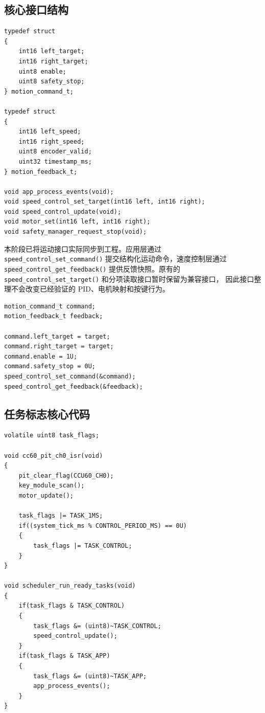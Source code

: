 \documentclass[11pt,a4paper,fontset=fandol]{ctexart}
\begin{document}
\subsection{核心接口结构}

\begin{lstlisting}
typedef struct
{
    int16 left_target;
    int16 right_target;
    uint8 enable;
    uint8 safety_stop;
} motion_command_t;

typedef struct
{
    int16 left_speed;
    int16 right_speed;
    uint8 encoder_valid;
    uint32 timestamp_ms;
} motion_feedback_t;

void app_process_events(void);
void speed_control_set_target(int16 left, int16 right);
void speed_control_update(void);
void motor_set(int16 left, int16 right);
void safety_manager_request_stop(void);
\end{lstlisting}

本阶段已将运动接口实际同步到工程。应用层通过
\texttt{speed\_control\_set\_command()} 提交结构化运动命令，速度控制层通过
\texttt{speed\_control\_get\_feedback()} 提供反馈快照。原有的
\texttt{speed\_control\_set\_target()} 和分项读取接口暂时保留为兼容接口，
因此接口整理不会改变已经验证的 PID、电机映射和按键行为。

\begin{lstlisting}
motion_command_t command;
motion_feedback_t feedback;

command.left_target = target;
command.right_target = target;
command.enable = 1U;
command.safety_stop = 0U;
speed_control_set_command(&command);
speed_control_get_feedback(&feedback);
\end{lstlisting}

\subsection{任务标志核心代码}

\begin{lstlisting}
volatile uint8 task_flags;

void cc60_pit_ch0_isr(void)
{
    pit_clear_flag(CCU60_CH0);
    key_module_scan();
    motor_update();

    task_flags |= TASK_1MS;
    if((system_tick_ms % CONTROL_PERIOD_MS) == 0U)
    {
        task_flags |= TASK_CONTROL;
    }
}

void scheduler_run_ready_tasks(void)
{
    if(task_flags & TASK_CONTROL)
    {
        task_flags &= (uint8)~TASK_CONTROL;
        speed_control_update();
    }
    if(task_flags & TASK_APP)
    {
        task_flags &= (uint8)~TASK_APP;
        app_process_events();
    }
}
\end{lstlisting}
\end{document}
